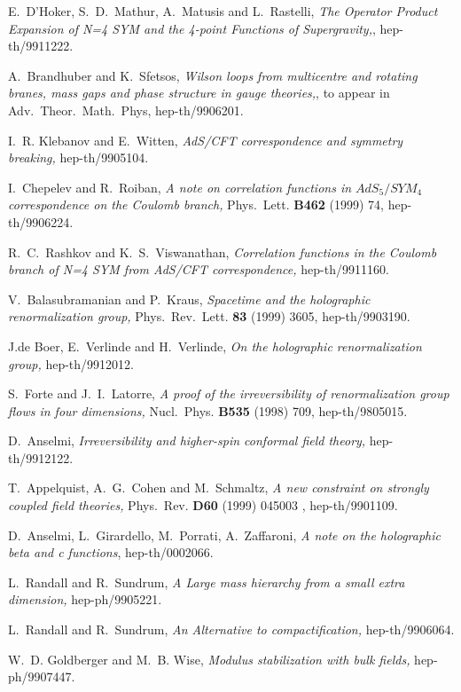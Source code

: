\documentclass[a4paper,12pt]{article}
\begin{document}
\begin{thebibliography}{99}
 E.~D'Hoker, S.~D.~Mathur, A.~Matusis and L.~Rastelli,
{\em The Operator Product Expansion of N=4 SYM and the 4-point
Functions of Supergravity,}, hep-th/9911222.

 A.~Brandhuber and K.~Sfetsos, {\em Wilson loops from
multicentre and rotating branes, mass gaps and phase structure in
gauge theories,}, to appear in Adv.~Theor.~Math.~Phys,
hep-th/9906201.
 

 I.~R. Klebanov and E.~Witten, {\em AdS/CFT
correspondence and symmetry breaking,} hep-th/9905104.

 I.~Chepelev and R.~Roiban, {\em A note on correlation
functions in $AdS_5/SYM_4$ correspondence on the Coulomb branch,}
Phys.~Lett. {\bf B462} (1999) 74, hep-th/9906224.


 R.~C.~Rashkov and K.~S.~Viswanathan, {\em Correlation
functions in the Coulomb branch of N=4 SYM from AdS/CFT
correspondence,} hep-th/9911160.




 V.~Balasubramanian and P.~Kraus, {\em Spacetime and the
holographic renormalization group,} Phys.~Rev.~Lett. {\bf 83} (1999)
3605, hep-th/9903190.

J.de Boer, E.~Verlinde and H.~Verlinde, {\em On the holographic renormalization group,} hep-th/9912012.

 S.~Forte and J.~I.~Latorre, {\em A proof of the
irreversibility of renormalization group flows in four dimensions,}
Nucl.~Phys. {\bf B535} (1998) 709, hep-th/9805015.

 D.~Anselmi, {\em Irreversibility and higher-spin
conformal field theory,} hep-th/9912122.

 T.~Appelquist, A.~G.~Cohen and M.~Schmaltz, {\em A new
constraint on strongly coupled field theories,} Phys.~Rev. {\bf D60}
(1999) 045003 , hep-th/9901109.


 D.~Anselmi, L.~Girardello, M.~Porrati, A.~Zaffaroni,
{\em A note on the holographic beta and c functions}, hep-th/0002066.

 L.~Randall and R.~Sundrum, {\em A Large mass hierarchy
from a small extra dimension,} hep-ph/9905221.

 L.~Randall and R.~Sundrum, {\em An Alternative to
compactification,} hep-th/9906064.

 W.~D. Goldberger and M.~B. Wise, {\em Modulus
stabilization with bulk fields,} hep-ph/9907447.


\end{thebibliography}
\end{document}
